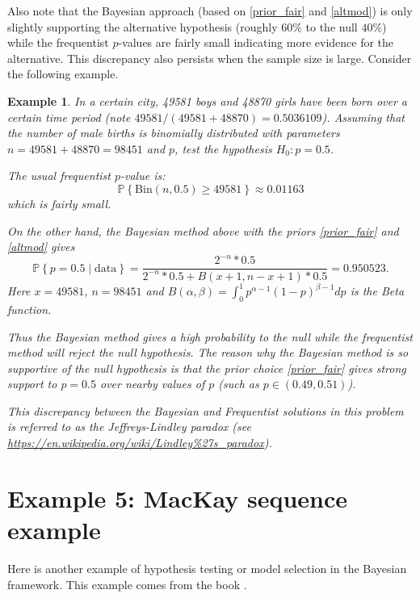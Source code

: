 \documentclass{scrartcl}
\newtheorem{example}[theorem]{Example}
\renewcommand{\P}{{\mathbb P}}
\begin{document}
Also note that the Bayesian approach (based on \eqref{prior_fair} and
\eqref{altmod}) is only slightly supporting the alternative hypothesis
(roughly $60\%$ to the null $40\%$) while the frequentist $p$-values
are fairly small indicating more evidence for the alternative. This
discrepancy also persists when the sample size is large. Consider the
following example.
\begin{example}
  In a certain city, 49581 boys and 48870 girls have been born over a
  certain time period (note $49581/(49581 + 48870) =
  0.5036109$). Assuming that the number of male births is 
  binomially distributed with parameters $n = 49581 + 48870 = 98451$
  and $p$, test the hypothesis $H_0 : p = 0.5$.

  The usual frequentist $p$-value is:
  \begin{equation*}
    \P\left\{\text{Bin}(n, 0.5) \geq 49581 \right\} \approx 0.01163
  \end{equation*}
  which is fairly small.

  On the other hand, the Bayesian method above with the priors
  \eqref{prior_fair} and \eqref{altmod} gives 
  \begin{equation*}
    \P \left\{p = 0.5 \mid \text{data} \right\} = \frac{2^{-n} *
      0.5}{2^{-n} * 0.5 + B(x+1, n-x+1) * 0.5} = 0.950523. 
  \end{equation*}
  Here $x = 49581$, $n = 98451$ and $B(\alpha, \beta) = \int_0^1
  p^{\alpha - 1} (1 - p)^{\beta - 1}  dp$ is the Beta function.

  Thus the Bayesian method gives a high probability to the null while
  the frequentist method will reject the null hypothesis. The reason
  why the Bayesian method is so supportive of the null hypothesis is
  that the prior choice \eqref{prior_fair} gives strong support to $p
  = 0.5$ over nearby values of $p$ (such as $p \in (0.49, 0.51)$).

  This discrepancy between the Bayesian and Frequentist solutions in
  this problem is referred to as the Jeffreys-Lindley paradox (see
  \url{https://en.wikipedia.org/wiki/Lindley%27s_paradox}). 
\end{example}

\section{Example 5: MacKay sequence example}

Here is another example of hypothesis testing or model selection in
the Bayesian framework. This example comes from the book
\citet[Chapter 28]{MacKay}. 
\end{document}
